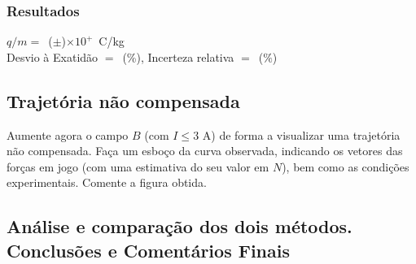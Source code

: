 \documentclass[a4paper,12pt]{article}  %
\begin{document}
\subsubsection{\sf Resultados}
\noindent  $q/m =$~(\underline{\makebox[1.5cm][r]{~}}$\pm$\underline{\makebox[1cm][r]{~}})$\times 10^{+}\,$  C/kg  \\  


\noindent  Desvio à Exatidão $=$~\underline{\makebox[1cm][r]{~}}(\%), 
Incerteza relativa $=$~\underline{\makebox[1cm][r]{~}}($\%$) 


\subsection{\sf Trajetória não compensada}
Aumente agora o campo $B$ (com $I\leq 3$ A) de forma a visualizar uma trajetória não compensada.  Faça um esboço da curva observada, indicando os vetores das forças em jogo (com uma estimativa do seu valor em $N$), bem como as condições experimentais. Comente a figura obtida.
\begin{center}
\framebox[18cm]{\rule{0pt}{6.5cm}}
\end{center}

\subsection{\sf Análise e comparação dos dois métodos. Conclusões e Comentários Finais}
\noindent\underline{\makebox[\textwidth][r]{~}} \\
\noindent\underline{\makebox[\textwidth][r]{~}} \\
\noindent\underline{\makebox[\textwidth][r]{~}} \\
\noindent\underline{\makebox[\textwidth][r]{~}} \\
\noindent\underline{\makebox[\textwidth][r]{~}} \\
\noindent\underline{\makebox[\textwidth][r]{~}} \\
\noindent\underline{\makebox[\textwidth][r]{~}} \\
\noindent\underline{\makebox[\textwidth][r]{~}} \\
\noindent\underline{\makebox[\textwidth][r]{~}} \\
\noindent\underline{\makebox[\textwidth][r]{~}} \\
\noindent\underline{\makebox[\textwidth][r]{~}} \\
\noindent\underline{\makebox[\textwidth][r]{~}} \\
\noindent\underline{\makebox[16.2cm][r]{~}} \\



\end{document}
